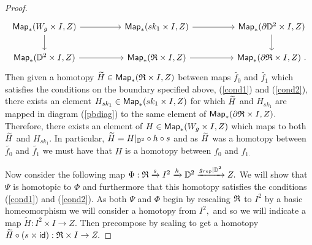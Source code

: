 \begin{proof}
\begin{equation} \label{pbdiag}
\begin{tikzcd} 
{\sf Map}_{\ast}(W_{g} \times I, Z) \arrow[rr, ""] \arrow[d, ""]
&&
{\sf Map}_{\ast}(sk_{1} \times I, Z) \arrow[rr, ""] 
&&
{\sf Map}_{\ast}(\partial \DD^{2} \times I, Z)  \arrow[d, ""] 
\\
{\sf Map}_{\ast}(\DD^{2} \times I, Z) \arrow[rr, ""]
&&
{\sf Map}_{\ast}(\frak{R} \times I, Z) \arrow[rr, ""]
&&
{\sf Map}_{\ast}(\partial \frak{R} \times I, Z)~.
\end{tikzcd}
\end{equation}
Then given a homotopy $\widetilde{H} \in {\sf Map}_{\ast}(\frak{R} \times I, Z)$ between maps $\tilde{f_{0}}$ and $\tilde{f_{1}}$ which satisfies the conditions on the boundary specified above, (\ref{cond1}) and (\ref{cond2}), there exists an element $H_{sk_{1}} \in {\sf Map}_{\ast}(sk_{1} \times I, Z)$ for which $\widetilde{H}$ and $H_{sk_{1}}$ are mapped in diagram (\ref{pbdiag}) to the same element of ${\sf Map}_{\ast}(\partial \frak{R} \times I, Z).$ Therefore, there exists an element of $H \in {\sf Map}_{\ast}(W_{g} \times I, Z)$ which maps to both $\widetilde{H}$ and $H_{sk_{1}}.$ In particular, $\widetilde{H} = H|_{\mathbb D^{2}} \circ h \circ s$ and as $\widetilde{H}$ was a homotopy between $\tilde{f_{0}}$ and $\tilde{f_{1}}$ we must have that $H$ is a homotopy between $f_{0}$ and $f_{1.}$


Now consider the following map $\Phi: \frak{R} \xrightarrow{s} I^{2} \xrightarrow{h} \mathbb D^{2} \xrightarrow{g_{rep}|\mathbb D^{2}} Z.$ We will show that $\Psi$ is homotopic to $\Phi$ and furthermore that this homotopy satisfies the conditions (\ref{cond1}) and (\ref{cond2}). As both $\Psi$ and $\Phi$ begin by rescaling $\frak{R}$ to $I^{2}$ by a basic homeomorphism we will consider a homotopy from $I^{2},$ and so we will indicate a map $\tilde{H}: I^{2} \times I \rightarrow Z.$ Then precompose by scaling to get a homotopy $\widetilde{H} \circ (s \times \operatorname{\sf id}): \frak{R} \times I \rightarrow Z.$ 


\end{proof}
